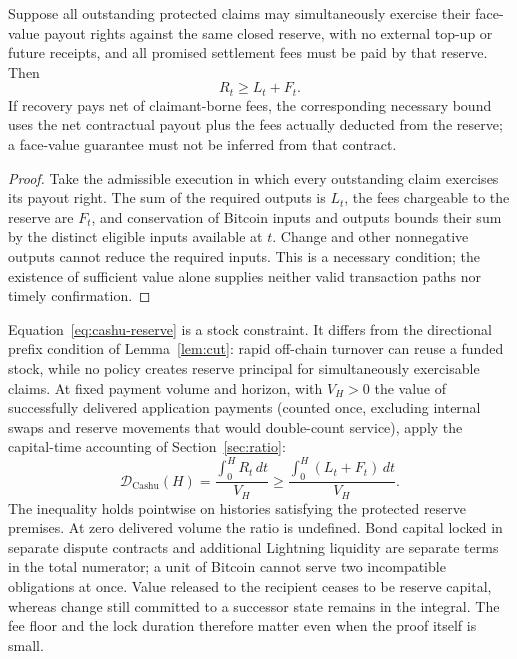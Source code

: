 \begin{proposition}
\label{prop:cashu-reserve}
Suppose all outstanding protected claims may simultaneously exercise their face-value payout rights against the same closed reserve, with no external top-up or future receipts, and all promised settlement fees must be paid by that reserve. Then
\begin{equation}
R_t\geq L_t+F_t.
\label{eq:cashu-reserve}
\end{equation}
If recovery pays net of claimant-borne fees, the corresponding necessary bound uses the net contractual payout plus the fees actually deducted from the reserve; a face-value guarantee must not be inferred from that contract.
\end{proposition}

\begin{proof}
Take the admissible execution in which every outstanding claim exercises its payout right. The sum of the required outputs is $L_t$, the fees chargeable to the reserve are $F_t$, and conservation of Bitcoin inputs and outputs bounds their sum by the distinct eligible inputs available at $t$. Change and other nonnegative outputs cannot reduce the required inputs. This is a necessary condition; the existence of sufficient value alone supplies neither valid transaction paths nor timely confirmation.
\end{proof}

Equation~\eqref{eq:cashu-reserve} is a stock constraint. It differs from the directional prefix condition of Lemma~\ref{lem:cut}: rapid off-chain turnover can reuse a funded stock, while no policy creates reserve principal for simultaneously exercisable claims. At fixed payment volume and horizon, with $V_H>0$ the value of successfully delivered application payments (counted once, excluding internal swaps and reserve movements that would double-count service), apply the capital-time accounting of Section~\ref{sec:ratio}:
\begin{equation}
\mathcal D_{\mathrm{Cashu}}(H)
 =\frac{\int_0^H R_t\,dt}{V_H}
 \geq \frac{\int_0^H (L_t+F_t)\,dt}{V_H}.
\label{eq:cashu-duration}
\end{equation}
The inequality holds pointwise on histories satisfying the protected reserve premises. At zero delivered volume the ratio is undefined. Bond capital locked in separate dispute contracts and additional Lightning liquidity are separate terms in the total numerator; a unit of Bitcoin cannot serve two incompatible obligations at once. Value released to the recipient ceases to be reserve capital, whereas change still committed to a successor state remains in the integral. The fee floor and the lock duration therefore matter even when the proof itself is small.


